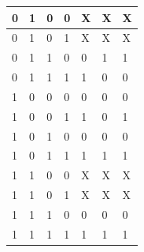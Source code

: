 \documentclass{article}
\begin{document}
\begin{enumerate}[label=\alph*.]
\begin{table}[!h]
\begin{tabular}{|l|l|l|l|l|l|l|}
0    & 1    & 0    & 0         & X                       & X                       & X                       \\ \hline
0    & 1    & 0    & 1         & X                       & X                       & X                       \\ \hline
0    & 1    & 1    & 0         & 0                       & 1                       & 1                       \\ \hline
0    & 1    & 1    & 1         & 1                       & 0                       & 0                       \\ \hline
1    & 0    & 0    & 0         & 0                       & 0                       & 0                       \\ \hline
1    & 0    & 0    & 1         & 1                       & 0                       & 1                       \\ \hline
1    & 0    & 1    & 0         & 0                       & 0                       & 0                       \\ \hline
1    & 0    & 1    & 1         & 1                       & 1                       & 1                       \\ \hline
1    & 1    & 0    & 0         & X                       & X                       & X                       \\ \hline
1    & 1    & 0    & 1         & X                       & X                       & X                       \\ \hline
1    & 1    & 1    & 0         & 0                       & 0                       & 0                       \\ \hline
1    & 1    & 1    & 1         & 1                       & 1                       & 1                       \\ \hline
\end{tabular}
\end{table}
\newpage


\end{enumerate}
\end{document}
